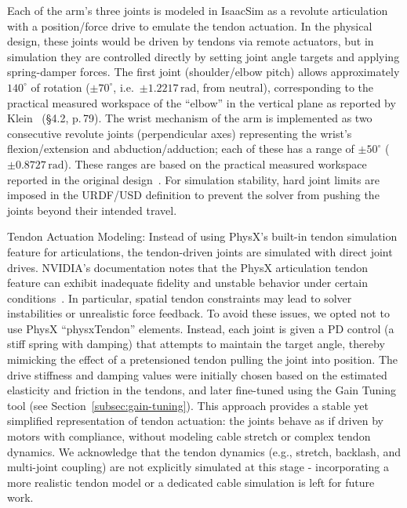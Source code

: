 Each of the arm's three joints is modeled in IsaacSim as a revolute articulation with a position/force drive to emulate the tendon actuation. In the physical design, these joints would be driven by tendons via remote actuators, but in simulation they are controlled directly by setting joint angle targets and applying spring-damper forces. The first joint (shoulder/elbow pitch) allows approximately $140^\circ$ of rotation ($\pm 70^\circ$, i.e.\ $\pm 1.2217\,\mathrm{rad}$, from neutral), corresponding to the practical measured workspace of the ``elbow'' in the vertical plane as reported by Klein~\cite{Klein2023} (§4.2, p.\,79). The wrist mechanism of the arm is implemented as two consecutive revolute joints (perpendicular axes) representing the wrist's flexion/extension and abduction/adduction; each of these has a range of $\pm 50^\circ$ ($\pm 0.8727\,\mathrm{rad}$). These ranges are based on the practical measured workspace reported in the original design~\cite{Klein2023}. For simulation stability, hard joint limits are imposed in the \ac{URDF}/\ac{USD} definition to prevent the solver from pushing the joints beyond their intended travel.

Tendon Actuation Modeling: Instead of using PhysX's built-in tendon simulation feature for articulations, the tendon-driven joints are simulated with direct joint drives. NVIDIA's documentation notes that the PhysX articulation tendon feature can exhibit inadequate fidelity and unstable behavior under certain conditions~\cite{IsaacSimDoc}. In particular, spatial tendon constraints may lead to solver instabilities or unrealistic force feedback. To avoid these issues, we opted not to use PhysX ``physxTendon'' elements. Instead, each joint is given a \ac{PD} control (a stiff spring with damping) that attempts to maintain the target angle, thereby mimicking the effect of a pretensioned tendon pulling the joint into position. The drive stiffness and damping values were initially chosen based on the estimated elasticity and friction in the tendons, and later fine-tuned using the Gain Tuning tool (see Section~\ref{subsec:gain-tuning}). This approach provides a stable yet simplified representation of tendon actuation: the joints behave as if driven by motors with compliance, without modeling cable stretch or complex tendon dynamics. We acknowledge that the tendon dynamics (e.g., stretch, backlash, and multi-joint coupling) are not explicitly simulated at this stage - incorporating a more realistic tendon model or a dedicated cable simulation is left for future work.

